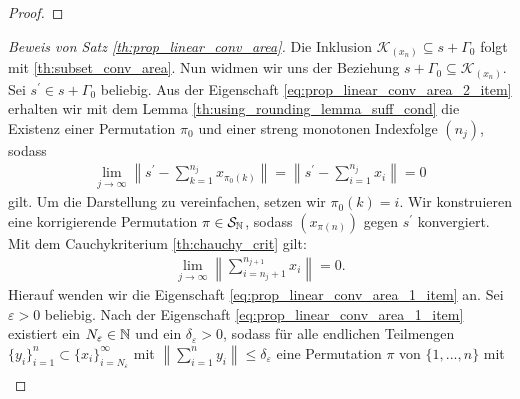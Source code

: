 \begin{proof}
\end{proof}

\begin{proof}[Beweis von Satz \ref{th:prop_linear_conv_area}]
	Die Inklusion $ \mathcal{K}_{(x_n)} \subseteq s + \Gamma_0 $ folgt mit \ref{th:subset_conv_area}.
	Nun widmen wir uns der Beziehung $ s + \Gamma_0 \subseteq \mathcal{K}_{(x_n)}$.
	Sei $ s^\prime \in s + \Gamma_0 $ beliebig.
	Aus der Eigenschaft \ref{eq:prop_linear_conv_area_2_item} erhalten wir mit dem Lemma \ref{th:using_rounding_lemma_suff_cond} die Existenz einer Permutation $ \pi_0 $ und einer streng monotonen Indexfolge $ (n_j) $, sodass 
	\begin{align*}
		\lim \limits_{j \to \infty}
		\left\| s^\prime - \sum \limits_{k = 1}^{n_j} x_{\pi_0(k)} 
		\right\|
		=
		\left\| s^\prime - \sum \limits_{i = 1}^{n_j} x_{i} 
		\right\|
		= 0
	\end{align*}
	gilt.
	Um die Darstellung zu vereinfachen, setzen wir $ \pi_0(k) = i $. 
	Wir konstruieren eine korrigierende Permutation $ \pi \in \mathcal{S}_{\mathbb{N}} $, sodass $ (x_{\pi(n)}) $ gegen $ s^\prime $ konvergiert.
\newpage
	Mit dem Cauchykriterium \ref{th:chauchy_crit} gilt:
	\begin{align*}
		\lim \limits_{j \to \infty}
		\left\|  \sum \limits_{i = n_j + 1}^{n_{j+1}} x_{i} 
		\right\|
		=
		0.
	\end{align*}
	Hierauf wenden wir die Eigenschaft \ref{eq:prop_linear_conv_area_1_item} an.
	Sei $ \varepsilon > 0 $ beliebig.
	Nach der Eigenschaft \ref{eq:prop_linear_conv_area_1_item} existiert ein $ N_\varepsilon \in \mathbb{N} $ und ein $ \delta_\varepsilon > 0 $, sodass für alle endlichen Teilmengen $ \{y_i\}_{i=1}^n \subset \{x_i \}_{ i = N_\varepsilon}^\infty $ mit $ \left\|
	\sum_{i=1}^n y_i\right\| \leq \delta_\varepsilon$
	eine Permutation $ \pi $ von $ \{1,...,n\} $ mit
	\begin{align*}

\end{align*}
\end{proof}
